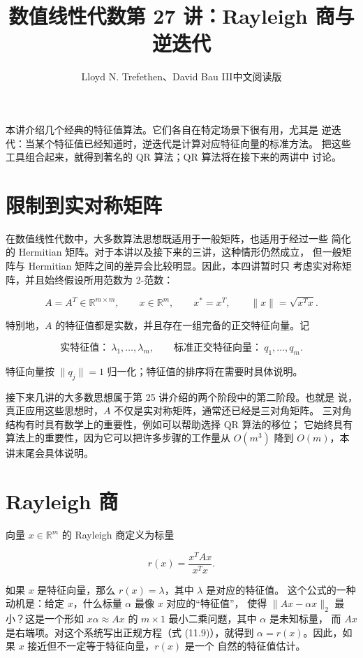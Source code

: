 \documentclass[UTF8,fontset=none,12pt]{ctexart}
\title{数值线性代数\quad 第 27 讲：Rayleigh 商与逆迭代}
\author{Lloyd N. Trefethen、David Bau III\quad 中文阅读版}
\date{}
\begin{document}
\maketitle
\pagestyle{plain}

本讲介绍几个经典的特征值算法。它们各自在特定场景下很有用，尤其是
逆迭代：当某个特征值已经知道时，逆迭代是计算对应特征向量的标准方法。
把这些工具组合起来，就得到著名的 QR 算法；QR 算法将在接下来的两讲中
讨论。

\section*{限制到实对称矩阵}

在数值线性代数中，大多数算法思想既适用于一般矩阵，也适用于经过一些
简化的 Hermitian 矩阵。对于本讲以及接下来的三讲，这种情形仍然成立，
但一般矩阵与 Hermitian 矩阵之间的差异会比较明显。因此，本四讲暂时只
考虑实对称矩阵，并且始终假设所用范数为 2-范数：

\[
A=A^T\in\mathbb{R}^{m\times m},\qquad
x\in\mathbb{R}^m,\qquad x^*=x^T,\qquad
\|x\|=\sqrt{x^Tx}.
\]

特别地，$A$ 的特征值都是实数，并且存在一组完备的正交特征向量。记

\[
\text{实特征值：}\ \lambda_1,\ldots,\lambda_m,
\qquad
\text{标准正交特征向量：}\ q_1,\ldots,q_m.
\]

特征向量按 $\|q_j\|=1$ 归一化；特征值的排序将在需要时具体说明。

接下来几讲的大多数思想属于第 25 讲介绍的两个阶段中的第二阶段。也就是
说，真正应用这些思想时，$A$ 不仅是实对称矩阵，通常还已经是三对角矩阵。
三对角结构有时具有数学上的重要性，例如可以帮助选择 QR 算法的移位；
它始终具有算法上的重要性，因为它可以把许多步骤的工作量从 $O(m^3)$
降到 $O(m)$，本讲末尾会具体说明。

\section*{Rayleigh 商}

向量 $x\in\mathbb{R}^m$ 的 Rayleigh 商定义为标量

\begin{equation}
 r(x)=\frac{x^TAx}{x^Tx}.
\tag{27.1}
\end{equation}

如果 $x$ 是特征向量，那么 $r(x)=\lambda$，其中 $\lambda$ 是对应的特征值。
这个公式的一种动机是：给定 $x$，什么标量 $\alpha$ 最像 $x$ 对应的“特征值”，
使得 $\|Ax-\alpha x\|_2$ 最小？这是一个形如
$x\alpha\approx Ax$ 的 $m\times1$ 最小二乘问题，其中 $\alpha$ 是未知标量，
而 $Ax$ 是右端项。对这个系统写出正规方程（式 (11.9)），就得到
$\alpha=r(x)$。因此，如果 $x$ 接近但不一定等于特征向量，$r(x)$ 是一个
自然的特征值估计。
\end{document}
